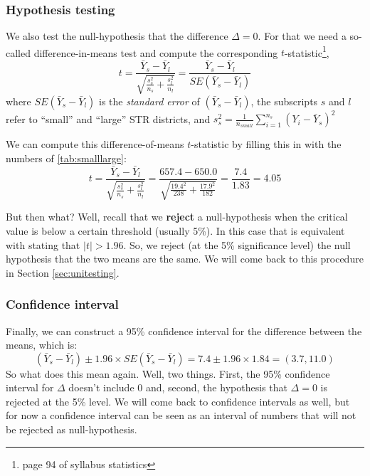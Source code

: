 \documentclass[
]{book}
\begin{document}
\hypertarget{hypothesis-testing}{%
\subsubsection{Hypothesis testing}\label{hypothesis-testing}}

We also test the null-hypothesis that the difference \(\Delta = 0\). For that we need a so-called difference-in-means test and compute the corresponding \(t\)-statistic\footnote{page 94 of syllabus statistics},
\begin{equation}
t = \frac{\bar{Y}_s - \bar{Y}_l}{\sqrt{\frac{s^2_s}{n_s} +\frac{s^2_l}{n_l} }} = \frac{\bar{Y}_s - \bar{Y}_l}{SE(\bar{Y}_s - \bar{Y}_l)}
\label{eq:testinglarge}
\end{equation}
where \(SE(\bar{Y}_s - \bar{Y}_l)\) is the \emph{standard error} of
\((\bar{Y}_s - \bar{Y}_l)\), the subscripts \(s\) and \(l\) refer to ``small'' and ``large'' STR districts, and \(s_s^2 = \frac{1}{n_{small}}\sum_{i=1}^{n_s}(Y_i - \bar{Y}_s)^2\)

We can compute this difference-of-means \(t\)-statistic by filling this in with the numbers of \ref{tab:smalllarge}:
\begin{equation}
t = \frac{\bar{Y}_s - \bar{Y}_l}{\sqrt{\frac{s^2_s}{n_s} +\frac{s^2_l}{n_l} }}  = \frac{657.4 - 650.0}{\sqrt{\frac{19.4^2}{238} +\frac{17.9^2}{182} }} = \frac{7.4}{1.83} = 4.05
\end{equation}

But then what? Well, recall that we \textbf{reject} a null-hypothesis when the critical value is below a certain threshold (usually 5\%). In this case that is equivalent with stating that \(|t|>1.96\). So, we reject (at the 5\% significance level) the null hypothesis that the two means are the same. We will come back to this procedure in Section \ref{sec:unitesting}.

\hypertarget{confidence-interval}{%
\subsubsection{Confidence interval}\label{confidence-interval}}

Finally, we can construct a 95\% confidence interval for the difference between the means, which is:
\begin{equation}
(\bar{Y}_s - \bar{Y}_l)\pm 1.96 \times SE(\bar{Y}_s - \bar{Y}_l) = 7.4 \pm 1.96 \times 1.84 = (3.7, 11.0)
\label{eq:cilarge}
\end{equation}
So what does this mean again. Well, two things. First, the 95\% confidence interval for \(\Delta\) doesn't include 0 and, second, the hypothesis that \(\Delta = 0\) is rejected at the 5\% level. We will come back to confidence intervals as well, but for now a confidence interval can be seen as an interval of numbers that will not be rejected as null-hypothesis.
\end{document}
